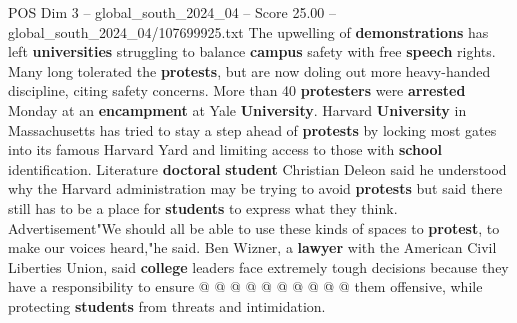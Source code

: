\begin{textsample}{POS Dim 3 – global\_south\_2024\_04 – Score 25.00 – global\_south\_2024\_04/107699925.txt}
The upwelling of \textbf{demonstrations} has left \textbf{universities} struggling to balance \textbf{campus} safety with free \textbf{speech} rights.
Many long tolerated the \textbf{protests}, but are now doling out more heavy-handed discipline, citing safety concerns.
More than 40 \textbf{protesters} were \textbf{arrested} Monday at an \textbf{encampment} at Yale \textbf{University}.
Harvard \textbf{University} in Massachusetts has tried to stay a step ahead of \textbf{protests} by locking most gates into its famous Harvard Yard and limiting access to those with \textbf{school} identification.
Literature \textbf{doctoral} \textbf{student} Christian Deleon said he understood why the Harvard administration may be trying to avoid \textbf{protests} but said there still has to be a place for \textbf{students} to express what they think.
Advertisement"We should all be able to use these kinds of spaces to \textbf{protest}, to make our voices heard,"he said.
Ben Wizner, a \textbf{lawyer} with the American Civil Liberties Union, said \textbf{college} leaders face extremely tough decisions because they have a responsibility to ensure @ @ @ @ @ @ @ @ @ @ them offensive, while protecting \textbf{students} from threats and intimidation.

\end{textsample}
